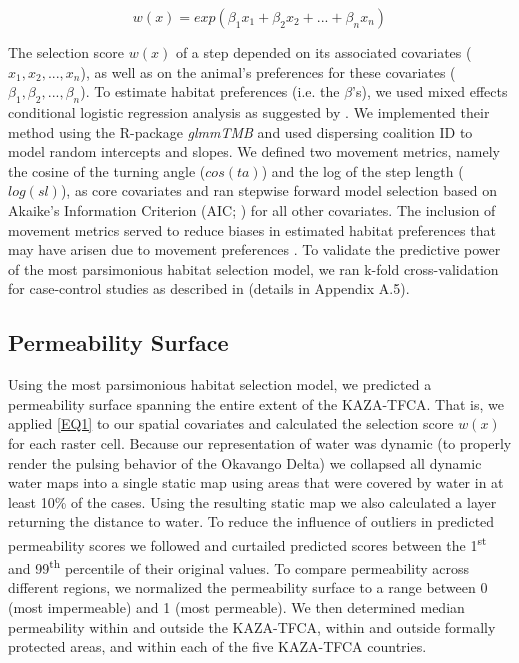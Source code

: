 \documentclass[abstract=on,10pt,a4paper,bibliography=totocnumbered]{article}
\begin{document}
\begin{equation}
\label{EQ1}
  w(x) = exp(\beta_1 x_1 + \beta_2 x_2 + ... + \beta_n x_n)
\end{equation}

\noindent The selection score \(w(x)\) of a step depended on its associated
covariates (\(x_1, x_2, ..., x_n\)), as well as on the animal's preferences for
these covariates (\(\beta_1, \beta_2, ..., \beta_n\)). To estimate habitat
preferences (i.e. the \(\beta\)'s), we used mixed effects conditional logistic
regression analysis as suggested by \cite{Muff.2020}. We implemented their
method using the R-package \textit{glmmTMB} \citep{Mollie.2017} and used
dispersing coalition ID to model random intercepts and slopes. We defined two
movement metrics, namely the cosine of the turning angle (\(cos(ta)\)) and the
log of the step length (\(log(sl)\)), as core covariates and ran stepwise
forward model selection based on Akaike's Information Criterion (AIC;
\citealp{Burnham.2002}) for all other covariates. The inclusion of movement
metrics served to reduce biases in estimated habitat preferences that may have
arisen due to movement preferences \citep{Avgar.2016}. To validate the
predictive power of the most parsimonious habitat selection model, we ran k-fold
cross-validation for case-control studies as described in \cite{Fortin.2009}
(details in Appendix A.5).

\subsection{Permeability Surface}
Using the most parsimonious habitat selection model, we predicted a permeability
surface spanning the entire extent of the KAZA-TFCA. That is, we applied
\ref{EQ1} to our spatial covariates and calculated the selection score \(w(x)\)
for each raster cell. Because our representation of water was dynamic (to
properly render the pulsing behavior of the Okavango Delta) we collapsed all
dynamic water maps into a single static map using areas that were covered by
water in at least 10\% of the cases. Using the resulting static map we also
calculated a layer returning the distance to water. To reduce the influence of
outliers in predicted permeability scores we followed \cite{Squires.2013} and
curtailed predicted scores between the 1\textsuperscript{st} and
99\textsuperscript{th} percentile of their original values. To compare
permeability across different regions, we normalized the permeability surface to
a range between 0 (most impermeable) and 1 (most permeable). We then determined
median permeability within and outside the KAZA-TFCA, within and outside
formally protected areas, and within each of the five KAZA-TFCA countries.
\end{document}
